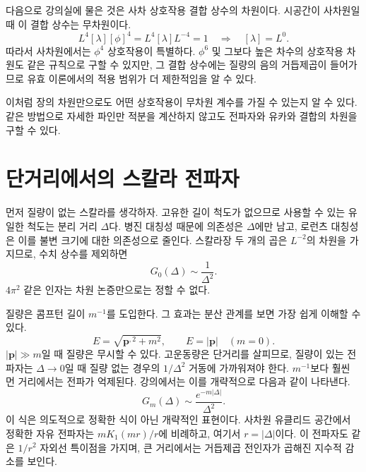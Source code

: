 다음으로 강의실에 물은 것은 사차 상호작용 결합 상수의 차원이다. 시공간이 사차원일 때 이 결합 상수는 무차원이다.
\begin{equation}
L^4[\lambda][\phi]^4=L^4[\lambda]L^{-4}=1
\quad\Longrightarrow\quad [\lambda]=L^0.
\end{equation}
따라서 사차원에서는 \(\phi^4\) 상호작용이 특별하다. \(\phi^6\) 및 그보다 높은 차수의 상호작용 차원도 같은 규칙으로 구할 수 있지만, 그 결합 상수에는 질량의 음의 거듭제곱이 들어가므로 유효 이론에서의 적용 범위가 더 제한적임을 알 수 있다.

이처럼 장의 차원만으로도 어떤 상호작용이 무차원 계수를 가질 수 있는지 알 수 있다. 같은 방법으로 자세한 파인만 적분을 계산하지 않고도 전파자와 유카와 결합의 차원을 구할 수 있다.

\section{단거리에서의 스칼라 전파자}

먼저 질량이 없는 스칼라를 생각하자. 고유한 길이 척도가 없으므로 사용할 수 있는 유일한 척도는 분리 거리 \(\Delta\)다. 병진 대칭성 때문에 의존성은 \(\Delta\)에만 남고, 로런츠 대칭성은 이를 불변 크기에 대한 의존성으로 줄인다. 스칼라장 두 개의 곱은 \(L^{-2}\)의 차원을 가지므로, 수치 상수를 제외하면
\begin{equation}
G_0(\Delta)\sim\frac{1}{\Delta^2}.
\end{equation}
\(4\pi^2\) 같은 인자는 차원 논증만으로는 정할 수 없다.

질량은 콤프턴 길이 \(m^{-1}\)를 도입한다. 그 효과는 분산 관계를 보면 가장 쉽게 이해할 수 있다.
\begin{equation}
E=\sqrt{\bm p^{,2}+m^2},
\qquad
E=|\bm p|\quad(m=0).
\end{equation}
\(|\bm p|\gg m\)일 때 질량은 무시할 수 있다. 고운동량은 단거리를 살피므로, 질량이 있는 전파자는 \(\Delta\to0\)일 때 질량 없는 경우의 \(1/\Delta^2\) 거동에 가까워져야 한다. \(m^{-1}\)보다 훨씬 먼 거리에서는 전파가 억제된다. 강의에서는 이를 개략적으로 다음과 같이 나타낸다.
\begin{equation}
G_m(\Delta)\sim \frac{e^{-m|\Delta|}}{\Delta^2}.
\end{equation}
이 식은 의도적으로 정확한 식이 아닌 개략적인 표현이다. 사차원 유클리드 공간에서 정확한 자유 전파자는 \(mK_1(mr)/r\)에 비례하고, 여기서 \(r=|\Delta|\)이다. 이 전파자도 같은 \(1/r^2\) 자외선 특이점을 가지며, 큰 거리에서는 거듭제곱 전인자가 곱해진 지수적 감소를 보인다.

